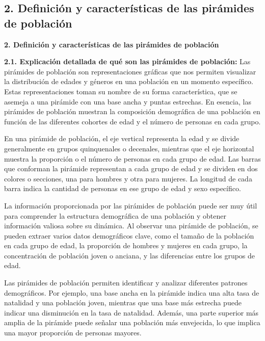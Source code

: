 \documentclass[8pt,a4paper]{beamer}
\begin{document}
{\begin{frame}{}
\end{frame}


\subsection{2. Definición y características de las pirámides de población}
\begin{frame}{\textbf{2. Definición y características de las pirámides de población}}
\begin{block}{\textbf{2.1. Explicación detallada de qué son las pirámides de población:}}
\justifying
Las pirámides de población son representaciones gráficas que nos permiten visualizar la distribución de edades y géneros en una población en un momento específico. Estas representaciones toman su nombre de su forma característica, que se asemeja a una pirámide con una base ancha y puntas estrechas. En esencia, las pirámides de población muestran la composición demográfica de una población en función de las diferentes cohortes de edad y el número de personas en cada grupo.

En una pirámide de población, el eje vertical representa la edad y se divide generalmente en grupos quinquenales o decenales, mientras que el eje horizontal muestra la proporción o el número de personas en cada grupo de edad. Las barras que conforman la pirámide representan a cada grupo de edad y se dividen en dos colores o secciones, una para hombres y otra para mujeres. La longitud de cada barra indica la cantidad de personas en ese grupo de edad y sexo específico.

La información proporcionada por las pirámides de población puede ser muy útil para comprender la estructura demográfica de una población y obtener información valiosa sobre su dinámica. Al observar una pirámide de población, se pueden extraer varios datos demográficos clave, como el tamaño de la población en cada grupo de edad, la proporción de hombres y mujeres en cada grupo, la concentración de población joven o anciana, y las diferencias entre los grupos de edad.

\end{block}
\end{frame}

\begin{frame}{}
\begin{block}{}
\justifying
Las pirámides de población permiten identificar y analizar diferentes patrones demográficos. Por ejemplo, una base ancha en la pirámide indica una alta tasa de natalidad y una población joven, mientras que una base más estrecha puede indicar una disminución en la tasa de natalidad. Además, una parte superior más amplia de la pirámide puede señalar una población más envejecida, lo que implica una mayor proporción de personas mayores.


\end{block}
\end{frame}}
\end{document}
